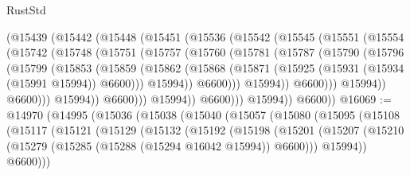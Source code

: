 \begin{lexlean}{RustStd}
\begin{coremodule}
                (@15439
                  (@15442
                    (@15448
                      (@15451
                        (@15536
                          (@15542
                            (@15545
                              (@15551
                                (@15554
                                  (@15742
                                    (@15748
                                      (@15751
                                        (@15757
                                          (@15760
                                            (@15781
                                              (@15787
                                                (@15790
                                                  (@15796
                                                    (@15799
                                                      (@15853
                                                        (@15859
                                                          (@15862
                                                            (@15868
                                                              (@15871
                                                                (@15925
                                                                  (@15931
                                                                    (@15934 (@15991 @15994))
                                                                    @6600)))
                                                              @15994))
                                                          @6600)))
                                                    @15994))
                                                @6600)))
                                          @15994))
                                      @6600)))
                                @15994))
                            @6600)))
                      @15994))
                  @6600)))
            @15994))
        @6600))
@16069 := @14970
    (@14995
      (@15036
        (@15038
          (@15040
            (@15057
              (@15080
                (@15095
                  (@15108
                    (@15117
                      (@15121
                        (@15129
                          (@15132
                            (@15192
                              (@15198
                                (@15201
                                  (@15207
                                    (@15210 (@15279 (@15285 (@15288 (@15294 @16042 @15994)) @6600)))
                                    @15994))
                                @6600)))

\end{coremodule}
\end{lexlean}
